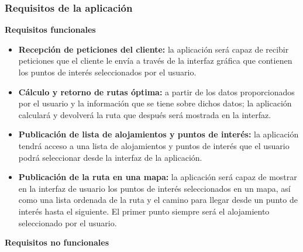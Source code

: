\subsubsection[Requisitos internos]{Requisitos de la aplicación}
\textbf{Requisitos funcionales}
\begin{itemize}
	\item \textbf{Recepción de peticiones del cliente:} la aplicación será capaz de recibir peticiones que el cliente le envía a través de la interfaz gráfica que contienen los puntos de interés seleccionados por el usuario.
	\item \textbf{Cálculo y retorno de rutas óptima:} a partir de los datos proporcionados por el usuario y la información que se tiene sobre dichos datos; la aplicación calculará y devolverá la ruta que después será mostrada en la interfaz.
	\item \textbf{Publicación de lista de alojamientos y puntos de interés:} la aplicación tendrá acceso a una lista de alojamientos y puntos de interés que el usuario podrá seleccionar desde la interfaz de la aplicación.
	\item \textbf{Publicación de la ruta en una mapa:} la aplicación será capaz de mostrar en la interfaz de usuario los puntos de interés seleccionados en un mapa, así como una lista ordenada de la ruta y el camino para llegar desde un punto de interés hasta el siguiente. El primer punto siempre será el alojamiento seleccionado por el usuario.
\end{itemize}
\textbf{Requisitos no funcionales}
